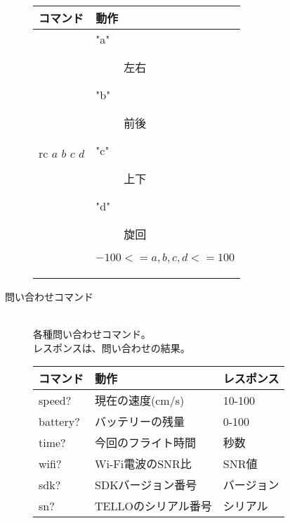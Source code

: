 \documentclass[a4paper, 12pt]{ltjsarticle}
\begin{document}
\begin{description}
        \begin{table}[h]
            \hspace{3\zw}
            \begin{tabular}{ll}
                \hline
                コマンド & 動作 \\ \hline \hline
                rc \(a\) \(b\) \(c\) \(d\) &
                \begin{minipage}{0.45\textwidth}
                    \vspace{0.5\zh}
                    \begin{description}
                        \item["a"] 左右 
                        \item["b"] 前後
                        \item["c"] 上下
                        \item["d"] 旋回
                    \end{description}
                    \( -100 <= a,b,c,d <= 100 \)
                    \vspace{0.5\zh}
                \end{minipage} \\ \hline
            \end{tabular}
        \end{table}
        \clearpage
    \item[問い合わせコマンド]\mbox{} \\
        各種問い合わせコマンド。\\
        レスポンスは、問い合わせの結果。
        \begin{table}[h]
            \hspace{3\zw}
            \begin{tabular}{lll}
                コマンド & 動作 & レスポンス \\ \hline \hline
                speed? & 現在の速度(cm/s) & 10-100 \\ \hline
                battery? & バッテリーの残量 & 0-100 \\ \hline
                time? & 今回のフライト時間 & 秒数 \\ \hline
                wifi? & Wi-Fi電波のSNR比 & SNR値 \\ \hline
                sdk? & SDKバージョン番号 & バージョン \\ \hline
                sn? & TELLOのシリアル番号 & シリアル \\ \hline
            \end{tabular}
        \end{table}
\end{description}
\clearpage
\end{document}
